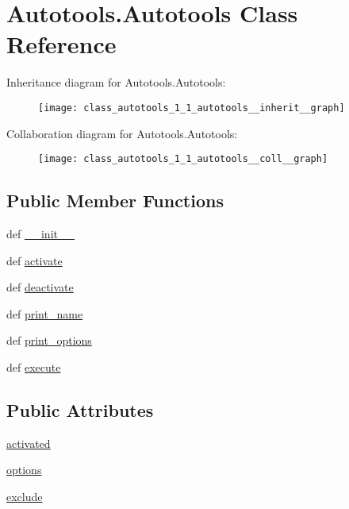 \hypertarget{class_autotools_1_1_autotools}{\section{Autotools.\-Autotools Class Reference}
\label{class_autotools_1_1_autotools}
}


Inheritance diagram for Autotools.\-Autotools\-:
\nopagebreak
\begin{figure}[H]
\begin{center}
\leavevmode
\texttt{[image: class\_autotools\_1\_1\_autotools\_\_inherit\_\_graph]}
\end{center}
\end{figure}


Collaboration diagram for Autotools.\-Autotools\-:
\nopagebreak
\begin{figure}[H]
\begin{center}
\leavevmode
\texttt{[image: class\_autotools\_1\_1\_autotools\_\_coll\_\_graph]}
\end{center}
\end{figure}
\subsection*{Public Member Functions}
\begin{DoxyCompactItemize}
\item 
def \hyperlink{group___tools_ga5b5ac092ad7f4bc45bf785633c8be95a}{\-\_\-\-\_\-init\-\_\-\-\_\-}
\item 
def \hyperlink{group___tools_ga202b0e727db575d20a381cd039dd3597}{activate}
\item 
def \hyperlink{group___tools_ga74513a2f4135b506e66c047559f9571e}{deactivate}
\item 
def \hyperlink{group___tools_ga0873459245ef2255a5a7386957fa592e}{print\-\_\-name}
\item 
def \hyperlink{group___tools_ga41481e9f2a7e7fce32f51cc8feb909fd}{print\-\_\-options}
\item 
def \hyperlink{group___tools_ga5ae85e70e9e6252f4be23ef60624f633}{execute}
\end{DoxyCompactItemize}
\subsection*{Public Attributes}
\begin{DoxyCompactItemize}
\item 
\hyperlink{group___tools_ga6bbb714a91bc8b6fe749326772b073b3}{activated}
\item 
\hyperlink{group___tools_ga8b348e19f0a7104bde9c43c3a6ed695d}{options}
\item 
\hyperlink{group___tools_gaee37d9789ea22ee310ebc357cd721b7f}{exclude}
\end{DoxyCompactItemize}


